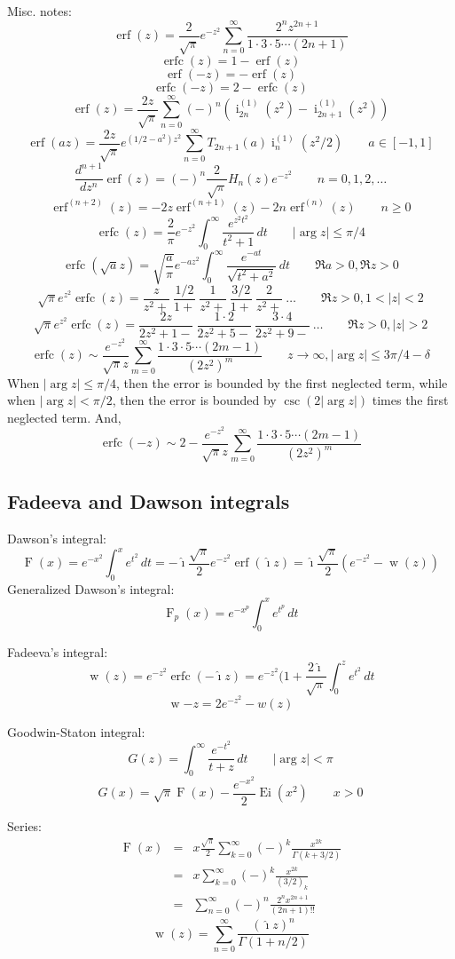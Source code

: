 \documentclass[10pt,dvipdfmx,letterpaper,twoside]{article}
\DeclareMathOperator{\erf}{erf}
\DeclareMathOperator{\erfc}{erfc}
\let\O=\operatorname
\newcommand{\ii}{{\hat{\imath}}}
\let\Gam=\Gamma
\begin{document}
Misc. notes:
\[ \erf(z) = \frac{2}{\sqrt{\pi}} e^{-z^2} \sum_{n=0}^\infty \frac{2^n z^{2n+1}}{1\cdot3\cdot5\cdots(2n+1)} \]
\[ \erfc(z) = 1 - \erf(z)\]
\[ \erf(-z) = -\erf(z) \]
\[ \erfc(-z) = 2 - \erfc(z) \]
\[ \erf(z) = \frac{2z}{\sqrt{\pi}} \sum_{n=0}^\infty (-)^n \left(\O{i}_{2n}^{(1)}(z^2) - \O{i}_{2n+1}^{(1)}(z^2)\right) \]
\[ \erf(az) = \frac{2z}{\sqrt{\pi}} e^{(1/2-a^2)z^2} \sum_{n=0}^\infty T_{2n+1}(a) \O{i}_{n}^{(1)}(z^2/2) \qquad a\in[-1,1] \]
\[ \frac{d^{n+1}}{dz^n}\erf(z) = (-)^n\frac{2}{\sqrt\pi} H_n(z) e^{-z^2} \qquad n=0,1,2,\dots \]
\[ \erf^{(n+2)}(z) = -2z\erf^{(n+1)}(z) - 2n\erf^{(n)}(z) \qquad n\geq0 \]
\[ \erfc(z) = \frac{2}{\pi} e^{-z^2}\int_0^\infty \frac{e^{z^2 t^2}}{t^2+1}\,dt \qquad |\arg z|\leq\pi/4 \]
\[ \erfc(\sqrt{a} z) = \sqrt{\frac{a}{\pi}} e^{-a z^2} \int_0^\infty \frac{e^{-at}}{\sqrt{t^2+a^2}}\,dt \qquad \Re a>0, \Re z>0 \]
\[ \sqrt\pi e^{z^2} \erfc(z) = \frac{z}{z^2+}\ \frac{1/2}{1+}\ \frac{1}{z^2+}\ \frac{3/2}{1+}\ \frac{2}{z^2+}\ \dots \qquad \Re z>0, 1<|z|<2 \]
\[ \sqrt\pi e^{z^2} \erfc(z) = \frac{2z}{2z^2+1-}\ \frac{1\cdot2}{2z^2+5-}\ \frac{3\cdot4}{2z^2+9-}\ \dots \qquad \Re z>0, |z|>2 \]
\[ \erfc(z) \sim \frac{e^{-z^2}}{\sqrt{\pi} z} \sum_{m=0}^\infty \frac{1\cdot3\cdot5\cdots(2m-1)}{(2z^2)^m} \qquad z\to\infty, |\arg z|\leq3\pi/4-\delta \]
When $|\arg z|\leq \pi/4$, then the error is bounded by the first neglected term, while when $|\arg z|<\pi/2$, then the
error is bounded by $\csc(2|\arg z|)$ times the first neglected term.
And,
\[ \erfc(-z) \sim 2 - \frac{e^{-z^2}}{\sqrt{\pi} z} \sum_{m=0}^\infty \frac{1\cdot3\cdot5\cdots(2m-1)}{(2z^2)^m} \]


\subsection{Fadeeva and Dawson integrals}
Dawson's integral:
\[ \O{F}(x) = e^{-x^2}\int_0^x e^{t^2}\,dt = -\ii\frac{\sqrt\pi}{2}e^{-z^2}\erf(\ii z) = \ii\frac{\sqrt{\pi}}{2}\left(e^{-z^2} -\O{w}(z)\right)\]
Generalized Dawson's integral:
\[ \O{F}_p(x) = e^{-x^p}\int_0^x e^{t^p}\,dt \]

Fadeeva's integral:
\[ \O{w}(z) = e^{-z^2}\erfc(-\ii z) = e^{-z^2}(1 + \frac{2\ii}{\sqrt\pi}\int_0^z e^{t^2}\,dt \]
\[ \O{w}{-z} = 2e^{-z^2} - w(z) \]

Goodwin-Staton integral: 
\[ G(z) = \int_0^\infty \frac{e^{-t^2}}{t+z}\,dt \qquad |\arg z|<\pi \]
\[ G(x) = \sqrt\pi \O{F}(x) - \frac{e^{-x^2}}{2}\O{Ei}(x^2) \qquad x>0 \]

Series:
\begin{eqnarray*}
\O{F}(x) &=& x\frac{\sqrt{\pi}}{2}\sum_{k=0}^\infty(-)^k\frac{x^{2k}}{\Gam(k+3/2)} \\
         &=& x\sum_{k=0}^\infty (-)^k \frac{x^{2k}}{(3/2)_k} \\
         &=& \sum_{n=0}^\infty (-)^n \frac{2^n x^{2n+1}}{(2n+1)!!}
\end{eqnarray*}
\[ \O{w}(z) = \sum_{n=0}^\infty \frac{(\ii z)^n}{\Gam(1+n/2)} \]
\end{document}
